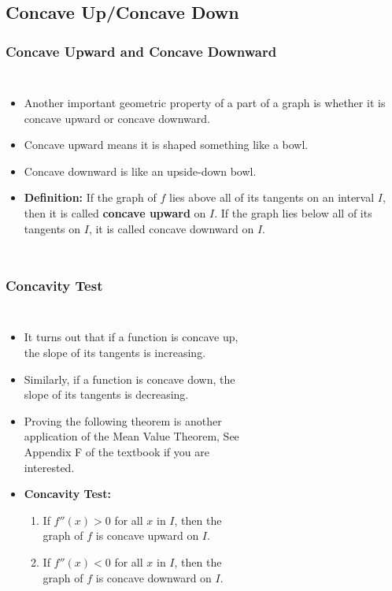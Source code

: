 \documentclass[serif,ignorenonframetext]{beamer}
\begin{document}
\begin{frame}
\begin{columns}
  \end{columns}
\end{frame}


\subsection{Concave Up/Concave Down}

\begin{frame}
  \frametitle{Concave Upward and Concave Downward}
  \begin{columns}
  \begin{itemize}[<+->]
  \item Another important geometric property of a part of
    a graph is whether it is concave upward or concave downward.
  \item Concave upward means it is shaped something like a bowl.
  \item Concave downward is like an upside-down bowl.
  \item \textbf{Definition:} If the graph of $f$ lies above all
    of its tangents on an interval $I$, then it is called 
    \textbf{concave upward} on $I$.  If the graph lies below
    all of its tangents on $I$, it is called concave downward on $I$.
  \end{itemize}
  \end{columns}
\end{frame}

\begin{frame}
  \frametitle{Concavity Test}
  \begin{columns}
  \begin{itemize}[<+->]
  \item It turns out that if a function is concave up, the slope
    of its tangents is increasing.
  \item Similarly, if a function is concave down, the slope of its
    tangents is decreasing.
  \item Proving the following theorem
    is another application of the Mean Value Theorem,
    See Appendix F of the textbook if you are interested.
  \item \textbf{Concavity Test:} 
    \begin{enumerate}
    \item If $f''(x)>0$ for all $x$ in $I$, then the graph of $f$ is
      concave upward on $I$.
    \item If $f''(x)<0$ for all $x$ in $I$, then the graph of $f$ is
      concave downward on $I$.
    \end{enumerate}
  \end{itemize}
  \begin{tabular}{c}
  \\
  \end{tabular}
  \end{columns}
\end{frame}
\end{document}
